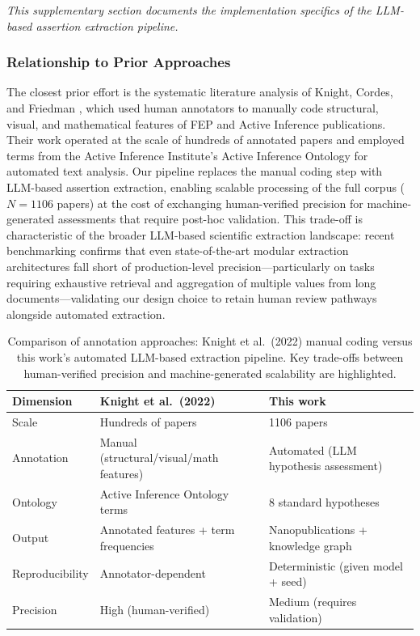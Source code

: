 \documentclass[
  english,
]{article}
\begin{document}
\emph{This supplementary section documents the implementation specifics
of the LLM-based assertion extraction pipeline.}

\subsubsection{Relationship to Prior
Approaches}\label{relationship-to-prior-approaches}

The closest prior effort is the systematic literature analysis of
Knight, Cordes, and Friedman \citep{knight2022fep}, which used human
annotators to manually code structural, visual, and mathematical
features of FEP and Active Inference publications. Their work operated
at the scale of hundreds of annotated papers and employed terms from the
Active Inference Institute's Active Inference Ontology for automated
text analysis. Our pipeline replaces the manual coding step with
LLM-based assertion extraction, enabling scalable processing of the full
corpus (\(N = 1106\) papers) at the cost of exchanging human-verified
precision for machine-generated assessments that require post-hoc
validation. This trade-off is characteristic of the broader LLM-based
scientific extraction landscape: recent benchmarking confirms that even
state-of-the-art modular extraction architectures fall short of
production-level precision---particularly on tasks requiring exhaustive
retrieval and aggregation of multiple values from long
documents---validating our design choice to retain human review pathways
alongside automated extraction.

\begin{table}[htbp]
\centering
\caption{Comparison of annotation approaches: Knight et al.\ (2022) manual coding versus this work's automated LLM-based extraction pipeline. Key trade-offs between human-verified precision and machine-generated scalability are highlighted.}
\label{tab:annotation_comparison}
\begin{tabular}{lll}
\toprule
\textbf{Dimension} & \textbf{Knight et al.\ (2022)} & \textbf{This work} \\
\midrule
Scale & Hundreds of papers & 1106 papers \\
Annotation & Manual (structural/visual/math features) & Automated (LLM hypothesis assessment) \\
Ontology & Active Inference Ontology terms & 8 standard hypotheses \\
Output & Annotated features + term frequencies & Nanopublications + knowledge graph \\
Reproducibility & Annotator-dependent & Deterministic (given model + seed) \\
Precision & High (human-verified) & Medium (requires validation) \\
\bottomrule
\end{tabular}
\end{table}
\end{document}
